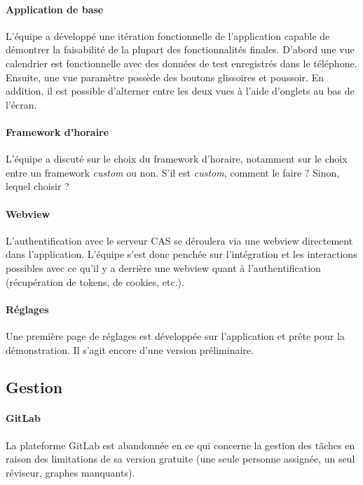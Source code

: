 	\paragraph{Application de base} L'équipe a développé une itération fonctionnelle de l'application capable de démontrer la faisabilité de la plupart des fonctionnalités finales. D'abord une vue calendrier est fonctionnelle avec des données de test enregistrés dans le téléphone. Ensuite, une vue paramètre possède des boutons glissoires et poussoir. En addition, il est possible d'alterner entre les deux vues à l'aide d'onglets au bas de l'écran.
	
	\paragraph{Framework d'horaire} L'équipe a discuté sur le choix du framework d'horaire, notamment sur le choix entre un framework \emph{custom} ou non. S'il est \emph{custom}, comment le faire ? Sinon, lequel choisir ?
	
	\paragraph{Webview} L'authentification avec le serveur CAS se déroulera via une webview directement dans l'application. L'équipe s'est donc penchée sur l'intégration et les interactions possibles avec ce qu'il y a derrière une webview quant à l'authentification (récupération de tokens, de cookies, etc.).	
	
	\paragraph{Réglages} Une première page de réglages est développée sur l'application et prête pour la démonstration. Il s'agit encore d'une version préliminaire.
	
	\subsection{Gestion}

	\paragraph{GitLab} La plateforme GitLab est abandonnée en ce qui concerne la gestion des tâches en raison des limitations de sa version gratuite (une seule personne assignée, un seul réviseur, graphes manquants).
	
